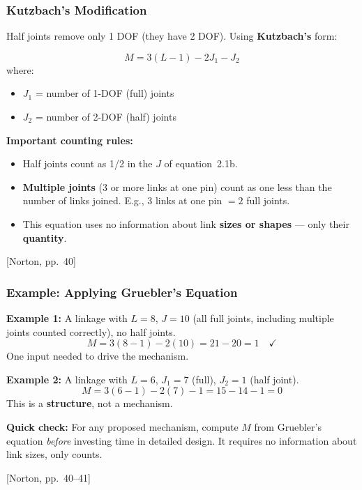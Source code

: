 \documentclass[10pt,aspectratio=43]{beamer}
\newcommand{\pref}[1]{\vfill\hfill{\scriptsize\color{gray}[Norton, pp.~#1]}}
\begin{document}
\begin{frame}
\frametitle{Kutzbach's Modification}

Half joints remove only 1 DOF (they have 2 DOF). Using \textbf{Kutzbach's} form:

\begin{redbox}
\[
  M = 3(L - 1) - 2J_1 - J_2 \tag{2.1c}
\]
where:
\begin{itemize}
  \item $J_1$ = number of 1-DOF (full) joints
  \item $J_2$ = number of 2-DOF (half) joints
\end{itemize}
\end{redbox}

\vspace{6pt}
\textbf{Important counting rules:}
\begin{itemize}
  \item Half joints count as 1/2 in the $J$ of equation~2.1b.
  \item \textbf{Multiple joints} (3 or more links at one pin) count as one less than the number of links joined. E.g., 3 links at one pin $= 2$ full joints.
  \item This equation uses no information about link \textbf{sizes or shapes} --- only their \textbf{quantity}.
\end{itemize}
\pref{40}
\end{frame}

\begin{frame}
\frametitle{Example: Applying Gruebler's Equation}

\textbf{Example 1:} A linkage with $L = 8$, $J = 10$ (all full joints, including multiple joints counted correctly), no half joints.
\[
  M = 3(8-1) - 2(10) = 21 - 20 = 1 \quad \checkmark
\]
One input needed to drive the mechanism.

\vspace{6pt}
\textbf{Example 2:} A linkage with $L = 6$, $J_1 = 7$ (full), $J_2 = 1$ (half joint).
\[
  M = 3(6-1) - 2(7) - 1 = 15 - 14 - 1 = 0
\]
This is a \textbf{structure}, not a mechanism.

\vspace{6pt}
\begin{greenbox}
\textbf{Quick check:} For any proposed mechanism, compute $M$ from Gruebler's equation \emph{before} investing time in detailed design. It requires no information about link sizes, only counts.
\end{greenbox}
\pref{40--41}
\end{frame}
\end{document}
